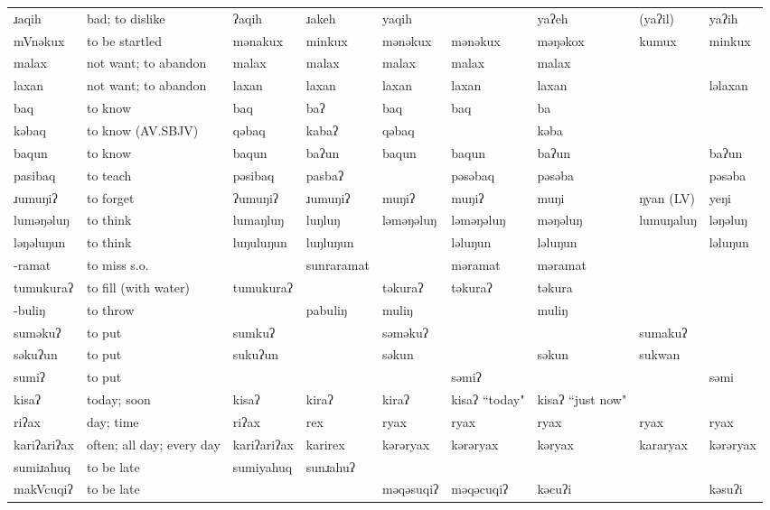 \begin{landscape}
\begin{longtable}{*{9}{p{}}}
\text{*}ɹaqih & bad; to dislike & ʔaqih & ɹakeh & yaqih &  & yaʔeh & (yaʔil) & yaʔih\\
\text{*}mVnəkux & to be startled & mənakux & minkux & mənəkux & mənəkux & məŋəkox & kumux & minkux\\
\text{*}malax & not want; to abandon & malax & malax & malax & malax & malax &  & \\
\text{*}laxan & not want; to abandon & laxan & laxan & laxan & laxan & laxan &  & ləlaxan\\
\text{*}baq & to know & baq & baʔ & baq & baq & ba &  & \\
\text{*}kəbaq & to know (AV.SBJV) & qəbaq & kabaʔ & qəbaq &  & kəba &  & \\
\text{*}baqun & to know & baqun & baʔun & baqun & baqun & baʔun &  & baʔun\\
\text{*}pasibaq & to teach & pəsibaq & pasbaʔ &  & pəsəbaq & pəsəba &  & pəsəba\\
\text{*}ɹumuŋiʔ & to forget & ʔumuŋiʔ & ɹumuŋiʔ & muŋiʔ & muŋiʔ & muŋi & ŋyan (LV) & yeŋi\\
\text{*}luməŋəluŋ & to think & lumaŋluŋ & luŋluŋ & ləməŋəluŋ & ləməŋəluŋ & məŋəluŋ & lumuŋaluŋ & ləŋəluŋ\\
\text{*}ləŋəluŋun & to think & luŋuluŋun & luŋluŋun &  & ləluŋun & ləluŋun &  & ləluŋun\\
\text{*}-ramat & to miss s.o. &  & sunraramat &  & məramat & məramat &  & \\
\text{*}tumukuraʔ & to fill (with water) & tumukuraʔ &  & təkuraʔ & təkuraʔ & təkura &  & \\
\text{*}-buliŋ & to throw &  & pabuliŋ & muliŋ &  & muliŋ &  & \\
\text{*}suməkuʔ & to put & sumkuʔ &  & səməkuʔ &  &  & sumakuʔ & \\
\text{*}səkuʔun & to put & sukuʔun &  & səkun &  & səkun & sukwan & \\
\text{*}sumiʔ & to put &  &  &  & səmiʔ &  &  & səmi\\
\text{*}kisaʔ & today; soon & kisaʔ & kiraʔ & kiraʔ & kisaʔ ``today" & kisaʔ ``just now" &  & \\
\text{*}riʔax & day; time & riʔax & rex & ryax & ryax & ryax & ryax & ryax\\
\text{*}kariʔariʔax & often; all day; every day & kariʔariʔax & karirex & kərəryax & kərəryax & kəryax & kararyax & kərəryax\\
\text{*}sumiɹahuq & to be late & sumiyahuq & sunɹahuʔ &  &  &  &  & \\
\text{*}makVcuqiʔ & to be late &  &  & məqəsuqiʔ & məqəcuqiʔ & kəcuʔi &  & kəsuʔi\\

\end{longtable}
\end{landscape}
